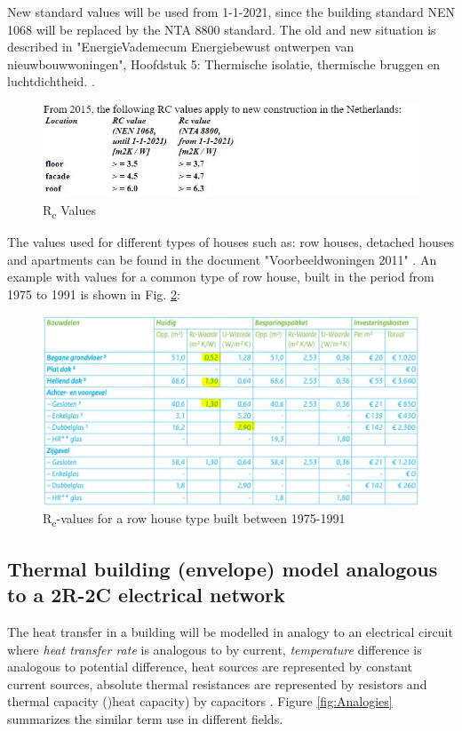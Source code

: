 New standard values will be used from 1-1-2021, since the building standard NEN 1068 will be replaced by the NTA 8800 standard. The old and new situation is described in "EnergieVademecum Energiebewust ontwerpen van nieuwbouwwoningen", Hoofdstuk 5: Thermische isolatie, thermische bruggen en luchtdichtheid.
\cite{ISSO}.

\begin{figure}[H]
	\centering
	\includegraphics[width=0.8\columnwidth]{Figures/Rc_values_2021.JPG}
	\caption[Short title]{R\textsubscript{c} Values \cite{RVALUE}}
	\label{fig:newRc}
\end{figure}

The values used for different types of houses such as: row houses, detached houses and apartments can be found in the document "Voorbeeldwoningen 2011" \cite{VOORBEELD}. An example with values for a common type of row house, built in the period from 1975 to 1991 is shown in Fig. \ref{row_house}:


\begin{figure}[H]
	\centering
	\includegraphics[width=0.8\columnwidth]{Figures/row_house_1975-1991.JPG}
	\caption[Short title]{R\textsubscript{c}-values for a row house type built between 1975-1991 \cite{VOORBEELD}}
	\label{row_house}
\end{figure} 

\subsection{Thermal building (envelope) model analogous to a 2R-2C electrical network}

The heat transfer in a building will be modelled in analogy to an electrical circuit where \emph{heat transfer rate} is analogous to by current, \emph{temperature} difference is analogous to potential difference, heat sources are represented by constant current sources, absolute thermal resistances are represented by resistors and thermal capacity ()heat capacity) by capacitors \cite{AbsTR}. Figure \ref{fig:Analogies} summarizes the similar term use in different fields.

